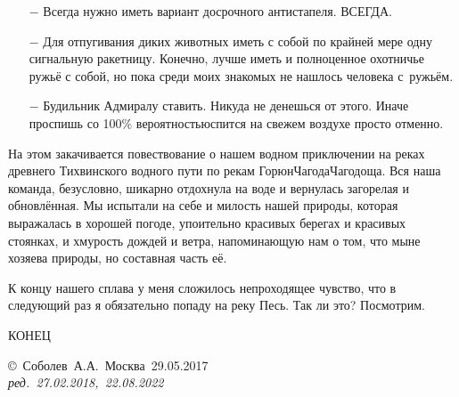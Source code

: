 \begin{enumerate}
\begin{enumerate}
		\item[$-$] Всегда нужно иметь вариант досрочного антистапеля. ВСЕГДА.
		\item[$-$] Для отпугивания диких животных иметь с собой по крайней мере одну сигнальную ракетницу. Конечно, лучше иметь и полноценное охотничье ружьё с собой, но пока среди моих знакомых не нашлось человека с~ружьём.
		\item[$-$] Будильник Адмиралу ставить. Никуда не денешься от этого. Иначе проспишь  со 100\% вероятностью\mdash спится на свежем воздухе просто отменно.
	\end{enumerate}
\end{enumerate}	

На этом закачивается повествование о нашем водном приключении на реках древнего Тихвинского водного пути по рекам Горюн\sdash Чагода\sdash Чагодоща. Вся наша команда, безусловно, шикарно отдохнула на воде и вернулась загорелая и обновлённая. Мы испытали на себе и милость нашей природы, которая выражалась в хорошей погоде, упоительно красивых берегах и красивых стоянках, и хмурость дождей и ветра, напоминающую нам о том, что мы\mdash не хозяева природы, но составная часть её.

К концу нашего сплава у меня сложилось непроходящее чувство, что в следующий раз я обязательно попаду на реку Песь. Так ли это? Посмотрим.

\begin{center}
\end{center}

\begin{center}
	\Large {КОНЕЦ}
\end{center}
\vspace{\fill}
\begin{flushright}
	\copyright~Соболев~А.А.~Москва~29.05.2017\\
	\textit{ред.~27.02.2018,~22.08.2022}
\end{flushright}